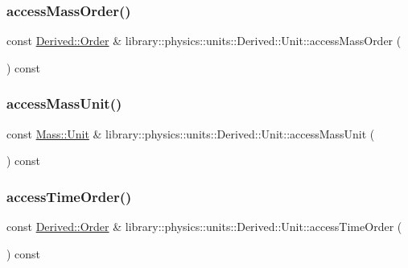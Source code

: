 \subsubsection{\texorpdfstring{access\+Mass\+Order()}{accessMassOrder()}}
{\footnotesize\ttfamily const \hyperlink{classlibrary_1_1physics_1_1units_1_1_derived_1_1_order}{Derived\+::\+Order} \& library\+::physics\+::units\+::\+Derived\+::\+Unit\+::access\+Mass\+Order (\begin{DoxyParamCaption}{ }\end{DoxyParamCaption}) const}

\mbox{\label{classlibrary_1_1physics_1_1units_1_1_derived_1_1_unit_a158968377ac0eaa7f61c37a49b4f7135}} 
\subsubsection{\texorpdfstring{access\+Mass\+Unit()}{accessMassUnit()}}
{\footnotesize\ttfamily const \hyperlink{classlibrary_1_1physics_1_1units_1_1_mass_a95f1e0434bc16794926b8e273bc2a54b}{Mass\+::\+Unit} \& library\+::physics\+::units\+::\+Derived\+::\+Unit\+::access\+Mass\+Unit (\begin{DoxyParamCaption}{ }\end{DoxyParamCaption}) const}

\mbox{\label{classlibrary_1_1physics_1_1units_1_1_derived_1_1_unit_a641fb00c4d2cc7a62d95015459dfa9ef}} 
\subsubsection{\texorpdfstring{access\+Time\+Order()}{accessTimeOrder()}}
{\footnotesize\ttfamily const \hyperlink{classlibrary_1_1physics_1_1units_1_1_derived_1_1_order}{Derived\+::\+Order} \& library\+::physics\+::units\+::\+Derived\+::\+Unit\+::access\+Time\+Order (\begin{DoxyParamCaption}{ }\end{DoxyParamCaption}) const}


